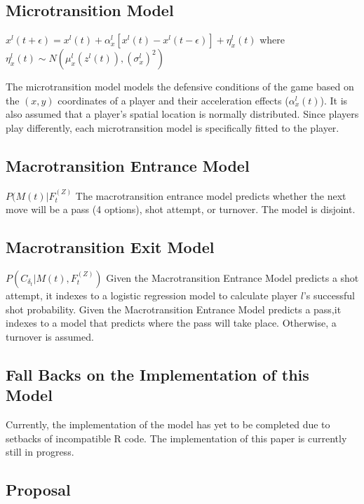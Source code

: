 \documentclass[12pt,twoside]{dukestatscithesis}
\theoremstyle{definition}
\theoremstyle{definition}
\theoremstyle{definition}
\theoremstyle{remark}
\begin{document}
\subsection{Microtransition Model}\label{microtransition-model}

\(x^{l}(t+\epsilon) = x^{l}(t) + \alpha^{l}_{x}[x^{l}(t) - x^{l}(t-\epsilon)] + \eta^{l}_{x}(t)\)
where
\(\eta^{l}_{x}(t) \sim N(\mu^{l}_{x}(z^{l}(t)), (\sigma^{l}_{x})^{2})\)

The microtransition model models the defensive conditions of the game
based on the \((x,y)\) coordinates of a player and their acceleration
effects (\(\alpha^{l}_{x}(t)\)). It is also assumed that a player's
spatial location is normally distributed. Since players play
differently, each microtransition model is specifically fitted to the
player.

\subsection{Macrotransition Entrance
Model}\label{macrotransition-entrance-model}

\(P(M(t)|F_{t}^{(Z)}\) The macrotransition entrance model predicts
whether the next move will be a pass (4 options), shot attempt, or
turnover. The model is disjoint.

\subsection{Macrotransition Exit
Model}\label{macrotransition-exit-model}

\(P(C_{\delta_{t}}|M(t), F_{t}^{(Z)})\) Given the Macrotransition
Entrance Model predicts a shot attempt, it indexes to a logistic
regression model to calculate player \(l\)'s successful shot
probability. Given the Macrotransition Entrance Model predicts a pass,it
indexes to a model that predicts where the pass will take place.
Otherwise, a turnover is assumed.

\subsection{Fall Backs on the Implementation of this
Model}\label{fall-backs-on-the-implementation-of-this-model}

Currently, the implementation of the model has yet to be completed due
to setbacks of incompatible R code. The implementation of this paper is
currently still in progress.

\subsection{Proposal}\label{proposal}
\end{document}
